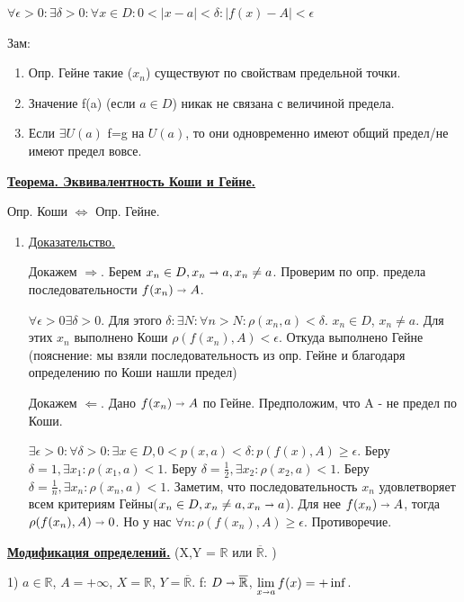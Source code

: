 \documentclass{article}
\newcommand{\thmm}[1]{\underline{\textbf{#1}}}
\begin{document}
$\forall \epsilon >0: \exists \delta >0:\forall x \in D: 0<|x-a|<\delta: |f(x)-A|<\epsilon$

Зам:
\begin{enumerate}
    \item Опр. Гейне такие ($x_n$) существуют по свойствам предельной точки.
    \item Значение f(a) (если $a\in D$) никак не связана с величиной предела.
    \item Если $\exists U(a)$ f=g на $U(a)$, то они одновременно имеют общий предел/не имеют предел вовсе.
\end{enumerate}

\thmm{Теорема. Эквивалентность Коши и Гейне.} 

Опр. Коши $\Leftrightarrow$ Опр. Гейне.


\begin{enumerate}
        \item[] \uline{Доказательство.}
        
        Докажем $\Rightarrow$.  Берем $ x_n \in D, x_n\shortrightarrow a, x_n \neq a$. Проверим по опр. предела последовательности $f(x_n)\shortrightarrow A$.
        
        $\forall \epsilon>0 \exists \delta >0$.  Для этого $\delta : \exists N:\forall n > N: \rho(x_n,a)<\delta$.  $x_n \in D$, $x_n \neq a$. Для этих $x_n$ выполнено Коши $\rho (f(x_n),A)<\epsilon$. Откуда выполнено Гейне (пояснение: мы взяли последовательность из опр. Гейне и благодаря определению по Коши нашли предел)

        Докажем $\Leftarrow$. Дано $f(x_n) \shortrightarrow A$ по Гейне. Предположим, что A - не предел по Коши. 
        
        $\exists \epsilon >0: \forall \delta > 0: \exists x \in D, 0<p(x,a)<\delta: p(f(x),A) \geq \epsilon$. 
        Беру  $\delta=1, \exists x_1: \rho(x_1, a)<1$. Беру $\delta=\frac{1}{2}, \exists x_2: \rho(x_2, a)<1$.  Беру $\delta=\frac{1}{n},\exists x_n: \rho(x_n,a)<1$. Заметим, что последовательность $x_n$ удовлетворяет всем критериям Гейны($x_n \in D, x_n \neq a, x_n \shortrightarrow a$). Для нее $f(x_n) \shortrightarrow A$, тогда $\rho(f(x_n),A) \shortrightarrow 0$. Но у нас $\forall n: \rho(f(x_n),A)\geq\epsilon$. Противоречие.
\end{enumerate}

\thmm{Модификация определений.} (X,Y = $\mathbb{R}$  или $\overline{\mathbb{R}}$. )

1) $a \in \mathbb{R}$, $A = +\infty$, $X =\mathbb{R}$, $Y=\overline{\mathbb{R}}$. f: $D \shortrightarrow \overline{\mathbb{R}}$, $\lim\limits_{x\shortrightarrow a} f(x) = +\inf$. 
\end{document}
